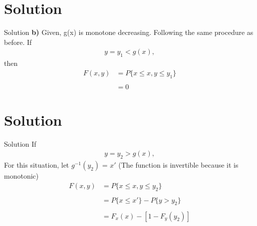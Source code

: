 \documentclass{beamer}
\begin{document}
\section{Solution}
\begin{frame}{Solution}
\textbf{b)} Given, g(x) is monotone decreasing. Following the same procedure as before. If
\begin{align}
    y = y_1 < g(x),
\end{align}
then
\begin{align*}
    F(x,y) &= P\{x \leq x, y \leq y_1\}\\\\
           &= 0
\end{align*}

\end{frame}

\section{Solution}
\begin{frame}{Solution}
If 
\begin{align}
    y = y_2 > g(x),
\end{align} 
For this situation, let $g^{-1}(y_2)$ = $x'$ (The function is invertible because it is monotonic)
\begin{align*}
    F(x,y) &= P\{x \leq x, y \leq y_2 \}\\\\
           &= P\{x \leq x'\} - P\{y > y_2\}\\\\
           &= F_x(x) - [1 - F_y(y_2)]
\end{align*}
    
\end{frame}
    
\end{document}
